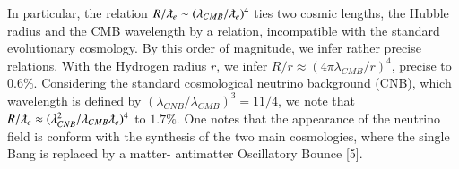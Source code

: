 \documentclass[twoside,draft]{article}
\begin{document}
\begin{sloppypar}
{In particular, the relation $R/\lambdabar_{e} \sim (\lambda_{CMB} / \lambdabar_{e})^{4}$ ties two cosmic lengths, the Hubble radius and the CMB wavelength by a relation, incompatible with the standard evolutionary cosmology. By this order of magnitude, we infer rather precise relations. With the Hydrogen radius $r$, we infer $R/r \approx (4\pi \lambda_{CMB} /r)^{4}$, precise to $0.6\%$. 
Considering the standard cosmological neutrino background (CNB), which wavelength is defined by $(\lambda_{CNB} / \lambda_{CMB})^{3} = 11/4$, we note that $R/ \lambdabar_{e} \approx
( \lambda_{CNB}^{2} / \lambda_{CMB} \lambdabar_{e} )^{4}$ to $1.7\%$.
 One notes that the appearance of the neutrino field is conform
with the synthesis of the two main cosmologies, where the single Bang is replaced by a matter-
antimatter Oscillatory Bounce [5].

}
\end{sloppypar}
\end{document}

